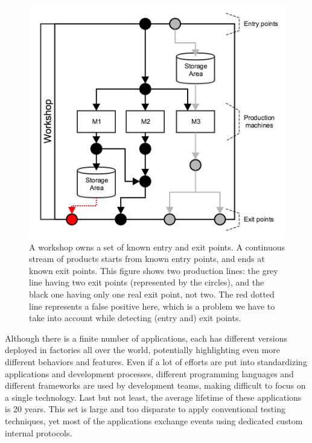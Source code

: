 \begin{figure}[ht]
    \begin{center}
        \includegraphics[width=1.0\linewidth]{figures/workshop-annotated.png}
    \end{center}

    \caption{A workshop owns a set of known entry and exit
    points. A continuous stream of products starts from known
    entry points, and ends at known exit points. This figure
    shows two production lines: the grey line having two exit
    points (represented by the circles), and the black one having
    only one real exit point, not two. The red dotted line
    represents a false positive here, which is a problem we have
    to take into account while detecting (entry and) exit
    points.}
    \label{fig:workshop-annotated}
\end{figure}

Although there is a finite number of applications, each has
different versions deployed in factories all over the world,
potentially highlighting even more different behaviors and
features. Even if a lot of efforts are put into standardizing
applications and development processes, different programming
languages and different frameworks are used by development
teams, making difficult to focus on a single technology. Last
but not least, the average lifetime of these applications is 20
years. This set is large and too disparate to apply conventional
testing techniques, yet most of the applications exchange events
using dedicated custom internal protocols.

